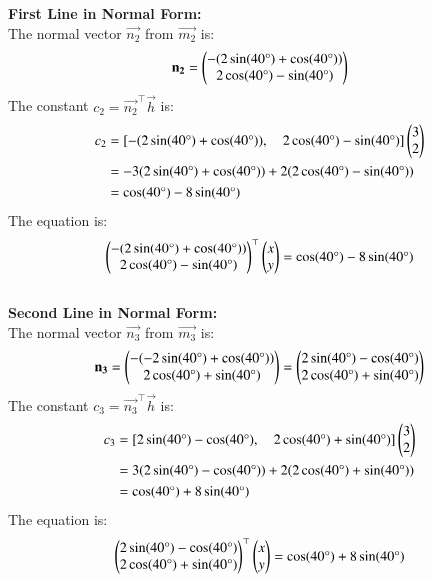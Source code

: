 \documentclass[journal]{IEEEtran}
\begin{document}
\textbf{First Line in Normal Form:}\\
The normal vector $\vec{n_2}$ from $\vec{m_2}$ is:
$$ \mathbf{n_2} = \begin{pmatrix}-(2\sin(40\degree) + \cos(40\degree)) \\ 2\cos(40\degree) - \sin(40\degree)\end{pmatrix} $$
The constant $c_2 = \vec{n_2}^\top \vec{h}$ is:
\begin{align*}
c_2 &= [-(2\sin(40\degree) + \cos(40\degree)), \quad 2\cos(40\degree) - \sin(40\degree)] \begin{pmatrix}3 \\ 2\end{pmatrix} \\
&= -3(2\sin(40\degree) + \cos(40\degree)) + 2(2\cos(40\degree) - \sin(40\degree)) \\
&= \cos(40\degree) - 8\sin(40\degree)
\end{align*}
The equation is:
$$ \begin{pmatrix}-(2\sin(40\degree) + \cos(40\degree)) \\ 2\cos(40\degree) - \sin(40\degree)\end{pmatrix}^\top \begin{pmatrix}x \\ y\end{pmatrix} = \cos(40\degree) - 8\sin(40\degree) $$\\

\textbf{Second Line in Normal Form:}\\
The normal vector $\vec{n_3}$ from $\vec{m_3}$ is:
$$ \mathbf{n_3} = \begin{pmatrix}-(-2\sin(40\degree) + \cos(40\degree)) \\ 2\cos(40\degree) + \sin(40\degree)\end{pmatrix} = \begin{pmatrix}2\sin(40\degree) - \cos(40\degree) \\ 2\cos(40\degree) + \sin(40\degree)\end{pmatrix} $$
The constant $c_3 = \vec{n_3}^\top \vec{h}$ is:
\begin{align*}
c_3 &= [2\sin(40\degree) - \cos(40\degree), \quad 2\cos(40\degree) + \sin(40\degree)] \begin{pmatrix}3 \\ 2\end{pmatrix} \\
&= 3(2\sin(40\degree) - \cos(40\degree)) + 2(2\cos(40\degree) + \sin(40\degree)) \\
&= \cos(40\degree) + 8\sin(40\degree)
\end{align*}
The equation is:
$$ \begin{pmatrix}2\sin(40\degree) - \cos(40\degree) \\ 2\cos(40\degree) + \sin(40\degree)\end{pmatrix}^\top \begin{pmatrix}x \\ y\end{pmatrix} = \cos(40\degree) + 8\sin(40\degree) $$
\end{document}
